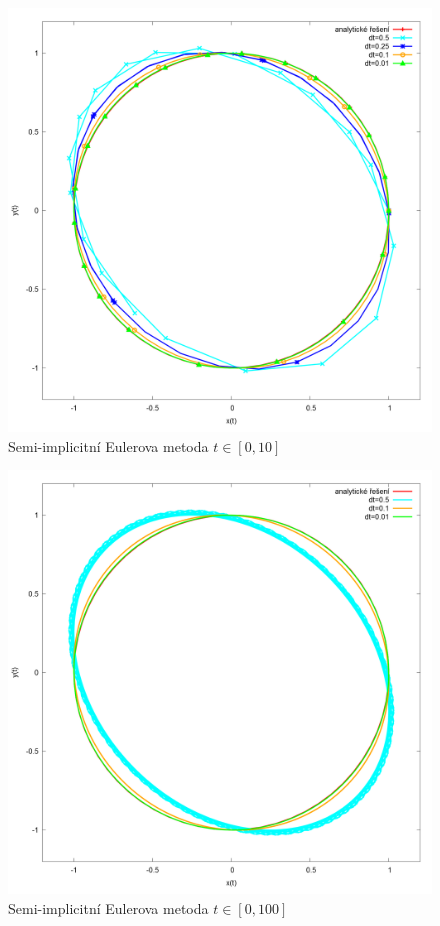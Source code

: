 \begin{figure}
	\caption{Semi-implicitní Eulerova metoda $ t\in [0,10] $}
	\label{fig:semiImplEuler} 
	\centering
	\includegraphics[width=\linewidth]{Figs/semiImplEuler}
\end{figure}
\begin{figure}
	\caption{Semi-implicitní Eulerova metoda $ t\in [0,100] $}
	\label{fig:semiImplEulerStab} 
	\centering
	\includegraphics[width=\linewidth]{Figs/semiImplEulerStab}
\end{figure}
